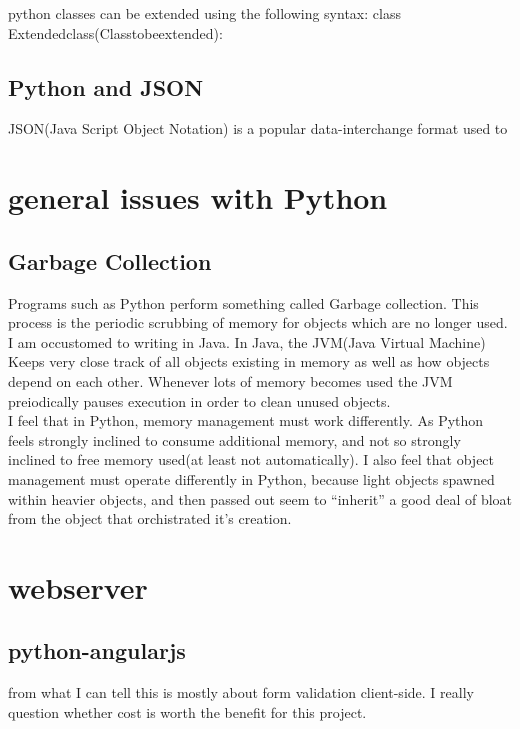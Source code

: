 python classes can be extended using the following syntax:
    class Extendedclass(Classtobeextended):

\subsection{Python and JSON}
JSON(Java Script Object Notation) is a popular data-interchange format used to


\section{general issues with Python}

\subsection{Garbage Collection}

Programs such as Python perform something called Garbage collection.  This process is the periodic scrubbing of memory for objects which are no longer used.\\
I am occustomed to writing in Java.  In Java, the JVM(Java Virtual Machine) Keeps very close track of all objects existing in memory as well as how objects depend on each other.  Whenever lots of memory becomes used the JVM preiodically pauses execution in order to clean unused objects.\\
I feel that in Python, memory management must work differently.  As Python feels strongly inclined to consume additional memory, and not so strongly inclined to free memory used(at least not automatically).  I also feel that object management must operate differently in Python, because light objects spawned within heavier objects, and then passed out seem to ``inherit'' a good deal of bloat from the object that orchistrated it's creation.



\section{webserver}

\subsection{python-angularjs}

from what I can tell this is mostly about form validation client-side.  I really question whether cost is worth the benefit for this project.



